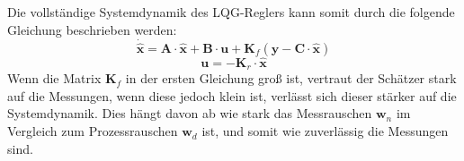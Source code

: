 Die vollständige Systemdynamik des LQG-Reglers kann somit durch die folgende Gleichung beschrieben werden:
\begin{equation}
\dot{\hat{\mathbf{x}}} = \mathbf{A} \cdot \hat{\mathbf{x}} + \mathbf{B} \cdot \mathbf{u} + \mathbf{K}_f (\mathbf{y} - \mathbf{C} \cdot \hat{\mathbf{x}})
\end{equation}
\begin{equation}
\mathbf{u} = -\mathbf{K}_r \cdot \hat{\mathbf{x}}
\end{equation}
Wenn die Matrix $\mathbf{K}_f$ in der ersten Gleichung groß ist, vertraut der Schätzer stark auf die Messungen, wenn diese jedoch klein ist, verlässt sich dieser stärker auf die Systemdynamik. Dies hängt davon ab wie stark das Messrauschen $\mathbf{w}_n$ im Vergleich zum Prozessrauschen $\mathbf{w}_d$ ist, und somit wie zuverlässig die Messungen sind.
\parencite{DataDrivenScience}